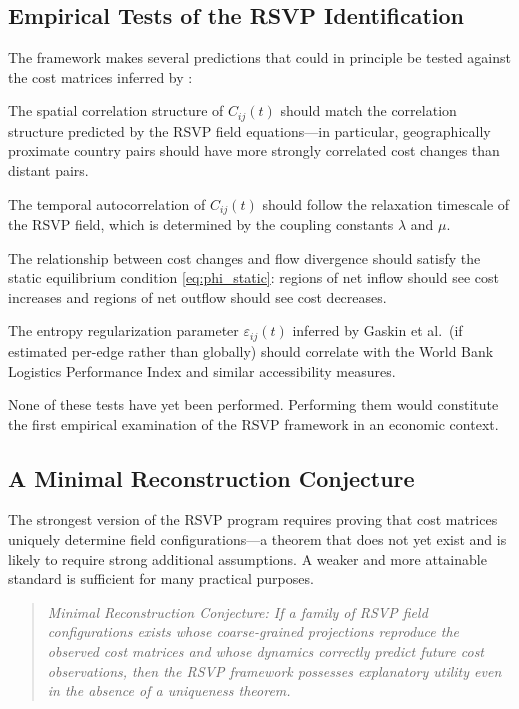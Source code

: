 \documentclass[12pt]{article}
\newcommand{\eps}{\varepsilon}
\begin{document}
\subsection{Empirical Tests of the RSVP Identification}

The framework makes several predictions that could in principle be tested against the cost matrices inferred by \citet{gaskin2026}:

The spatial correlation structure of $C_{ij}(t)$ should match the correlation structure predicted by the RSVP field equations---in particular, geographically proximate country pairs should have more strongly correlated cost changes than distant pairs.

The temporal autocorrelation of $C_{ij}(t)$ should follow the relaxation timescale of the RSVP field, which is determined by the coupling constants $\lambda$ and $\mu$.

The relationship between cost changes and flow divergence should satisfy the static equilibrium condition \eqref{eq:phi_static}: regions of net inflow should see cost increases and regions of net outflow should see cost decreases.

The entropy regularization parameter $\eps_{ij}(t)$ inferred by Gaskin et al.\ (if estimated per-edge rather than globally) should correlate with the World Bank Logistics Performance Index and similar accessibility measures.

None of these tests have yet been performed. Performing them would constitute the first empirical examination of the RSVP framework in an economic context.

\subsection{A Minimal Reconstruction Conjecture}

The strongest version of the RSVP program requires proving that cost matrices uniquely determine field configurations---a theorem that does not yet exist and is likely to require strong additional assumptions. A weaker and more attainable standard is sufficient for many practical purposes.

\begin{quote}
\itshape Minimal Reconstruction Conjecture: If a family of RSVP field configurations exists whose coarse-grained projections reproduce the observed cost matrices and whose dynamics correctly predict future cost observations, then the RSVP framework possesses explanatory utility even in the absence of a uniqueness theorem.
\end{quote}
\end{document}
